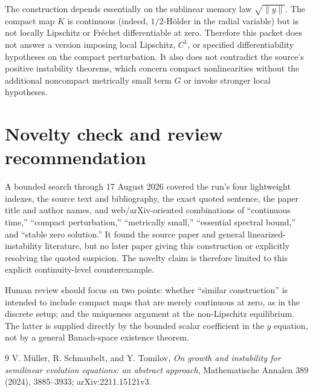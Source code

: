 \documentclass[11pt]{article}
\begin{document}
The construction depends essentially on the sublinear memory law
$\sqrt{\|y\|}$.  The compact map $K$ is continuous (indeed, $1/2$-H\"older in
the radial variable) but is not locally Lipschitz or Fr\'echet differentiable
at zero.  Therefore this packet does not answer a version imposing local
Lipschitz, $C^1$, or specified differentiability hypotheses on the compact
perturbation.  It also does not contradict the source's positive instability
theorems, which concern compact nonlinearities without the additional
noncompact metrically small term $G$ or invoke stronger local hypotheses.

\section{Novelty check and review recommendation}

A bounded search through 17 August 2026 covered the run's four lightweight
indexes, the source text and bibliography, the exact quoted sentence, the
paper title and author names, and web/arXiv-oriented combinations of
``continuous time,'' ``compact perturbation,'' ``metrically small,''
``essential spectral bound,'' and ``stable zero solution.''  It found the
source paper and general linearized-instability literature, but no later
paper giving this construction or explicitly resolving the quoted suspicion.
The novelty claim is therefore limited to this explicit continuity-level
counterexample.

Human review should focus on two points: whether ``similar construction'' is
intended to include compact maps that are merely continuous at zero, as in the
discrete setup; and the uniqueness argument at the non-Lipschitz equilibrium.
The latter is supplied directly by the bounded scalar coefficient in the
$y$ equation, not by a general Banach-space existence theorem.

\begin{thebibliography}{9}
V. M\"uller, R. Schnaubelt, and Y. Tomilov,
\emph{On growth and instability for semilinear evolution equations: an
abstract approach}, Mathematische Annalen 389 (2024), 3885--3933;
arXiv:2211.15121v3.
\end{thebibliography}
\end{document}

